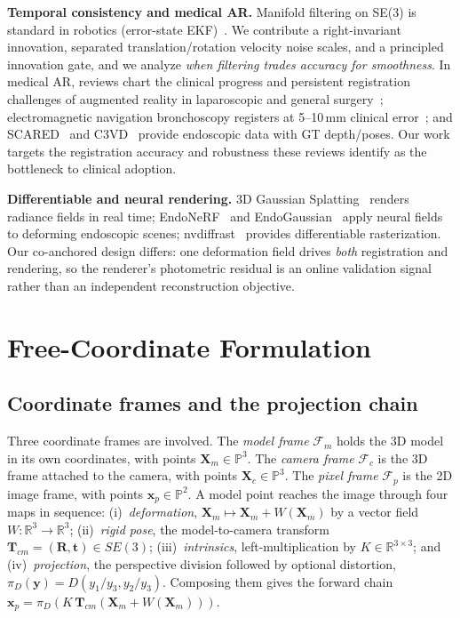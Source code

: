 \documentclass[9pt,twoside,web]{ieeecolor2}
\begin{document}
\textbf{Temporal consistency and medical AR.} Manifold filtering on SE(3) is standard in robotics (error-state EKF)~\cite{kalman1960,sola2018lie}. We contribute a right-invariant innovation, separated translation/rotation velocity noise scales, and a principled innovation gate, and we analyze \emph{when filtering trades accuracy for smoothness}. In medical AR, reviews chart the clinical progress and persistent registration challenges of augmented reality in laparoscopic and general surgery~\cite{bernhardt2017ar,vavra2017ar}; electromagnetic navigation bronchoscopy registers at 5--10\,mm clinical error~\cite{gildea2006enb}; and SCARED~\cite{allan2021scared} and C3VD~\cite{bobrow2023c3vd} provide endoscopic data with GT depth/poses. Our work targets the registration accuracy and robustness these reviews identify as the bottleneck to clinical adoption.

\textbf{Differentiable and neural rendering.} 3D Gaussian Splatting~\cite{kerbl20233dgs} renders radiance fields in real time; EndoNeRF~\cite{wang2022endonerf} and EndoGaussian~\cite{zhu2023endogaussian} apply neural fields to deforming endoscopic scenes; nvdiffrast~\cite{laine2020nvdiffrast} provides differentiable rasterization. Our co-anchored design differs: one deformation field drives \emph{both} registration and rendering, so the renderer's photometric residual is an online validation signal rather than an independent reconstruction objective.

\section{Free-Coordinate Formulation}\label{sec:form}

\subsection{Coordinate frames and the projection chain}
Three coordinate frames are involved. The \emph{model frame} $\mathcal{F}_{m}$ holds the 3D model in its own coordinates, with points $\mathbf{X}_{m}\in\mathbb{P}^{3}$. The \emph{camera frame} $\mathcal{F}_{c}$ is the 3D frame attached to the camera, with points $\mathbf{X}_{c}\in\mathbb{P}^{3}$. The \emph{pixel frame} $\mathcal{F}_{p}$ is the 2D image frame, with points $\mathbf{x}_{p}\in\mathbb{P}^{2}$. A model point reaches the image through four maps in sequence: (i)~\emph{deformation}, $\mathbf{X}_{m}\mapsto\mathbf{X}_{m}+W(\mathbf{X}_{m})$ by a vector field $W:\mathbb{R}^{3}\to\mathbb{R}^{3}$; (ii)~\emph{rigid pose}, the model-to-camera transform $\mathbf{T}_{cm}=(\mathbf{R},\mathbf{t})\in SE(3)$; (iii)~\emph{intrinsics}, left-multiplication by $K\in\mathbb{R}^{3\times3}$; and (iv)~\emph{projection}, the perspective division followed by optional distortion, $\pi_{D}(\mathbf{y})=D(y_{1}/y_{3},y_{2}/y_{3})$. Composing them gives the forward chain $\mathbf{x}_{p}=\pi_{D}(K\,\mathbf{T}_{cm}(\mathbf{X}_{m}+W(\mathbf{X}_{m})))$.
\end{document}
